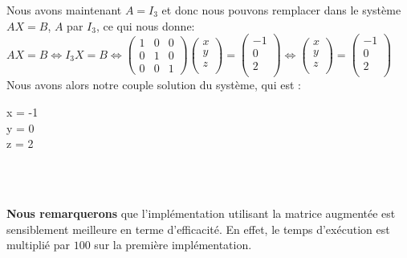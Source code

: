 Nous avons maintenant $A=I_3$ et donc nous pouvons remplacer dans le système $AX=B$, $A$ par $I_3$, ce qui nous donne: \vspace{4pt}\\
$
AX=B \iff I_3X=B
\iff
    \begin{pmatrix}
        1 & 0 & 0\\
        0 & 1 & 0 \\
        0 & 0 & 1
    \end{pmatrix}
    \begin{pmatrix}
    	x \\
		y \\
		z \\
    \end{pmatrix}
    =
    \begin{pmatrix}
    	-1\\
		0 \\
		2 \\
    \end{pmatrix}
    \iff
    \begin{pmatrix}
    	x \\
		y \\
		z \\
    \end{pmatrix}
    =
    \begin{pmatrix}
    	-1\\
		0 \\
		2 \\
    \end{pmatrix}$
\vspace{6pt}\\
Nous avons alors notre couple solution du système, qui est : \vspace{4pt}\\
\begin{System}
  x = -1 \\
  y = 0 \\
  z = 2 
\end{System}\\

\newpage

\newpage

\\
\textbf{Nous remarquerons} que l'implémentation utilisant la matrice augmentée est sensiblement meilleure en terme d'efficacité. En effet, le temps d'exécution est multiplié par $100$ sur la première implémentation.